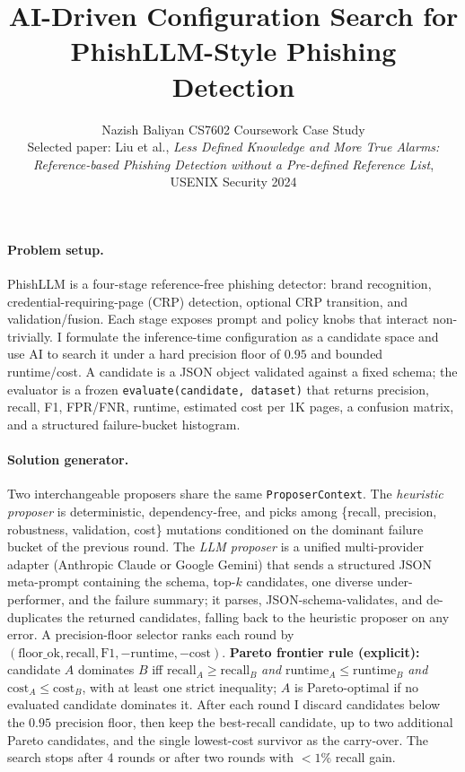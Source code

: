 \documentclass[11pt,a4paper]{article}
\title{\vspace{-1.0em}\textbf{AI-Driven Configuration Search for PhishLLM-Style Phishing Detection}}
\author{Nazish Baliyan \quad CS7602 Coursework Case Study \\[-0.4em]
\small Selected paper: Liu et al., \emph{Less Defined Knowledge and More True Alarms: Reference-based Phishing Detection without a Pre-defined Reference List}, USENIX Security 2024}
\date{}
\begin{document}
\maketitle
\vspace{-2em}

\paragraph{Problem setup.}
PhishLLM is a four-stage reference-free phishing detector: brand
recognition, credential-requiring-page (CRP) detection, optional CRP
transition, and validation/fusion. Each stage exposes prompt and policy
knobs that interact non-trivially. I formulate the inference-time
configuration as a candidate space and use AI to search it under a hard
precision floor of $0.95$ and bounded runtime/cost. A candidate is a JSON
object validated against a fixed schema; the evaluator is a frozen
\texttt{evaluate(candidate, dataset)} that returns precision, recall, F1,
FPR/FNR, runtime, estimated cost per 1K pages, a confusion matrix, and a
structured failure-bucket histogram.

\paragraph{Solution generator.}
Two interchangeable proposers share the same \texttt{ProposerContext}.
The \emph{heuristic proposer} is deterministic, dependency-free, and picks
among \{recall, precision, robustness, validation, cost\} mutations
conditioned on the dominant failure bucket of the previous round. The
\emph{LLM proposer} is a unified multi-provider adapter (Anthropic Claude
or Google Gemini) that sends a structured JSON meta-prompt containing
the schema, top-$k$ candidates, one diverse under-performer, and the
failure summary; it parses, JSON-schema-validates, and de-duplicates the
returned candidates, falling back to the heuristic proposer on any error.
A precision-floor selector ranks each round by
$(\text{floor\_ok}, \text{recall}, \text{F1}, -\text{runtime}, -\text{cost})$.
\textbf{Pareto frontier rule (explicit):} candidate $A$ dominates $B$ iff
$\text{recall}_A\!\ge\!\text{recall}_B$ \emph{and}
$\text{runtime}_A\!\le\!\text{runtime}_B$ \emph{and}
$\text{cost}_A\!\le\!\text{cost}_B$, with at least one strict inequality;
$A$ is Pareto-optimal if no evaluated candidate dominates it. After each
round I discard candidates below the $0.95$ precision floor, then keep
the best-recall candidate, up to two additional Pareto candidates, and
the single lowest-cost survivor as the carry-over. The search stops
after 4 rounds or after two rounds with $<\!1\%$ recall gain.
\end{document}
